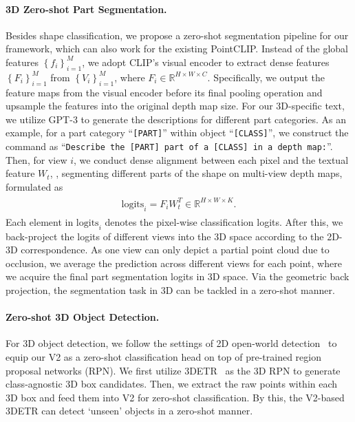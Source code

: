 \documentclass[10pt,twocolumn,letterpaper]{article}
\begin{document}
\paragraph{3D Zero-shot Part Segmentation.}
Besides shape classification, we propose a zero-shot segmentation pipeline for our framework, which can also work for the existing PointCLIP. Instead of the global features $\left \{f_{i} \right \}_{i=1}^{M}$, we adopt CLIP's visual encoder to extract dense features $\left \{F_{i} \right \}_{i=1}^{M}$ from $\left\{V_{i} \right \}_{i=1}^{M}$, where $F_i \in \mathbb{R}^{H \times W \times C}$. Specifically, we output the feature maps from the visual encoder before its final pooling operation and upsample the features into the original depth map size. 
For our 3D-specific text, we utilize GPT-3 to generate the descriptions for different part categories. As an example, for a part category ``\texttt{[PART]}'' within object ``\texttt{[CLASS]}'', we construct the command as ``\texttt{Describe the {[PART]} part of a {[CLASS]} in a depth map:}''.
Then, for view $i$, we conduct dense alignment between each pixel and the textual feature $W_{t}$, \ie, segmenting different parts of the shape on multi-view depth maps, formulated as
\begin{align}
\begin{split}
    \mathrm{logits}_{i} = F_i W_t^T \in \mathbb{R}^{H \times W \times K}.
\end{split}
\end{align}
Each element in $\mathrm{logits}_{i}$ denotes the pixel-wise classification logits. After this, we back-project the logits of different views into the 3D space according to the 2D-3D correspondence. As one view can only depict a partial point cloud due to occlusion, we average the prediction across different views for each point, where we acquire the final part segmentation logits in 3D space. Via the geometric back projection, the segmentation task in 3D can be tackled in a zero-shot manner.

\vspace{-0.2cm}
\paragraph{Zero-shot 3D Object Detection.}
For 3D object detection, we follow the settings of 2D open-world detection~\cite{gu2021open, zhong2022regionclip} to equip our V2 as a zero-shot classification head on top of pre-trained region proposal networks (RPN). 
We first utilize 3DETR~\cite{misra2021end} as the 3D RPN to generate class-agnostic 3D box candidates.
Then, we extract the raw points within each 3D box and feed them into V2 for zero-shot classification. 
By this, the V2-based 3DETR can detect `unseen' objects in a zero-shot manner.
\end{document}
